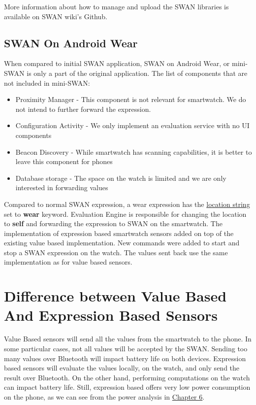 More information about how to manage and upload the SWAN libraries is available on SWAN wiki's Github\cite{swanWiki}.

\subsection{SWAN On Android Wear}
When compared to initial SWAN application, SWAN on Android Wear, or mini-SWAN is only a part of the original application.
The list of components that are not included in mini-SWAN:
\begin{itemize}
 \item Proximity Manager - This component is not relevant for smartwatch. We do not intend to further forward the expression.
 \item Configuration Activity - We only implement an evaluation service with no UI components
 \item Beacon Discovery - While smartwatch has scanning capabilities, it is better to leave this component for phones
 \item Database storage - The space on the watch is limited and we are only interested in forwarding values
\end{itemize}

Compared to normal SWAN expression, a wear expression has the \hyperref[fig:SwanExpression]{location string} set to \textbf{wear} keyword. Evaluation Engine is responsible for changing the location
to \textbf{self} and forwarding the expression to SWAN on the smartwatch.
The implementation of expression based smartwatch sensors added on top of the existing value based implementation. New commands were added to start and stop a SWAN expression on the watch.
The values sent back use the same implementation as for value based sensors.

\section{Difference between Value Based And Expression Based Sensors}
Value Based sensors will send all the values from the smartwatch to the phone. In some particular cases, not all values will be accepted by the SWAN.
Sending too many values over Bluetooth will impact battery life on both devices.
Expression based sensors will evaluate the values locally, on the watch, and only send the result over Bluetooth. On the other hand, performing
computations on the watch can impact battery life. Still, expression based offers very low power consumption on the phone, as we can see from the power analysis in \hyperref[Chapter6]{Chapter 6}.
